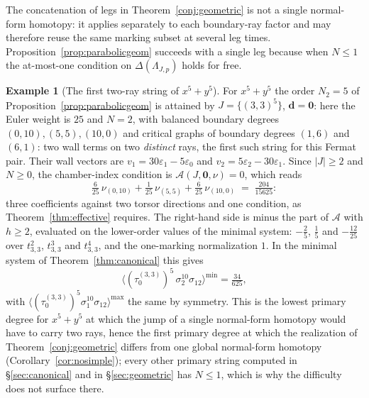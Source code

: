 \documentclass[11pt]{amsart}
\theoremstyle{definition}
\newtheorem{example}[theorem]{Example}
\theoremstyle{remark}
\newcommand{\Ascr}{\mathcal{A}}
\begin{document}
The concatenation of legs in Theorem~\ref{conj:geometric} is not a single
normal-form homotopy: it applies \cite[Lem.~3.40]{GKT} separately
to each boundary-ray factor and may therefore reuse the same marking subset at
several leg times. Proposition~\ref{prop:parabolicgeom} succeeds with a
single leg because when $N\le1$ the at-most-one condition on
$\Delta(\Lambda_{J,p})$ holds for free.

\begin{example}[The first two-ray string of $x^5+y^5$]
\label{ex:tworay}
For $x^{5}+y^{5}$ the order $N_{2}=5$ of
Proposition~\ref{prop:parabolicgeom} is attained by $J=\{(3,3)^{5}\}$,
$\mathbf d=\mathbf 0$: here the Euler weight is $25$ and
$N=2$, with balanced boundary degrees $(0,10),(5,5),(10,0)$ and critical graphs of
boundary degrees $(1,6)$ and $(6,1)$: two wall terms on two \emph{distinct} rays,
the first such string for this Fermat pair. Their wall vectors are
$v_{1}=30\varepsilon_{1}-5\varepsilon_{0}$ and $v_{2}=5\varepsilon_{2}-30\varepsilon_{1}$. Since $|J|\ge2$ and $N\ge0$, the
chamber-index condition is $\Ascr(J,\mathbf 0,\nu)=0$, which reads
\[
\tfrac{6}{25}\,\nu_{(0,10)}+\tfrac1{25}\,\nu_{(5,5)}+\tfrac{6}{25}\,\nu_{(10,0)}
\;=\;\tfrac{204}{15625}:
\]
three coefficients against two torsor directions and one condition, as
Theorem~\ref{thm:effective} requires.  The right-hand side is minus the part
of $\Ascr$ with $h\ge2$, evaluated on the lower-order values of the minimal
system: $-\tfrac25$, $\tfrac15$ and $-\tfrac{12}{25}$ over $t_{3,3}^{2}$,
$t_{3,3}^{3}$ and $t_{3,3}^{4}$, and the one-marking normalization $1$. In the minimal system of
Theorem~\ref{thm:canonical} this gives
\[
\bigl\langle(\tau_{0}^{(3,3)})^{5}\,\sigma_{2}^{10}\sigma_{12}\bigr\rangle^{\min}
=\tfrac{34}{625},
\]
with $\bigl\langle(\tau_{0}^{(3,3)})^{5}\sigma_{1}^{10}\sigma_{12}\bigr\rangle^{\max}$
the same by symmetry. This is the lowest primary degree
for $x^5+y^5$
at which the jump of a single normal-form homotopy would have to carry two rays,
hence the first primary degree at which the realization of
Theorem~\ref{conj:geometric} differs from one global normal-form homotopy
(Corollary~\ref{cor:nosimple}); every other primary string computed
in \S\ref{sec:canonical} and in \S\ref{sec:geometric} has $N\le1$, which is
why the difficulty does not surface there.


\end{example}
\end{document}
